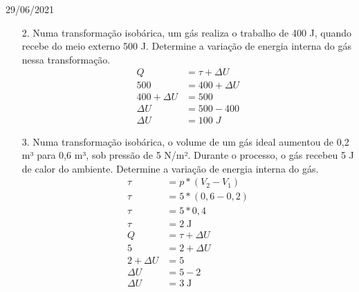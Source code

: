 \documentclass{SchoolBook}
\begin{document}
    \begin{day}{29/06/2021}
        \begin{enumerate}
            \item[2.] Numa transformação isobárica, um gás realiza o trabalho de 400 J, quando recebe do meio externo 500 J. Determine a variação de energia interna do gás nessa transformação.
            \begin{align*}
                             Q &= \tau + \Delta U \\
                           500 &= 400 + \Delta U  \\
                400 + \Delta U &= 500             \\
                      \Delta U &= 500 - 400       \\
                      \Delta U &= 100\;J
            \end{align*}
            
            \item[3.] Numa transformação isobárica, o volume de um gás ideal aumentou de 0,2 m³ para 0,6 m³, sob pressão de 5 N/m². Durante o processo, o gás recebeu 5 J de calor do ambiente. Determine a variação de energia interna do gás.
            \begin{align*}
                \tau &= p * (V_2 - V_1)  \\
                \tau &= 5 * (0,6 - 0,2)  \\
                \tau &= 5 * 0,4          \\
                \tau &= 2\;\si{\joule}   \\[3pt]
                   Q &= \tau + \Delta U  \\
                   5 &= 2 + \Delta U     \\
                   2 + \Delta U &= 5     \\
                       \Delta U &= 5 - 2 \\
                       \Delta U &= 3\;\si{\joule}
            \end{align*}
            

\end{enumerate}
\end{day}
\end{document}
